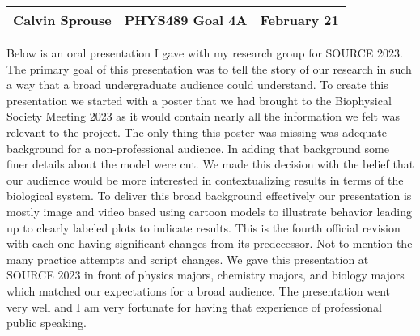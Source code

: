 \documentclass[a4paper, 12pt]{config/homework}
\begin{document}
\noindent
\begin{tabularx}{\textwidth}{>{\centering\arraybackslash}X>{\centering\arraybackslash}X>{\centering\arraybackslash}X}
Calvin Sprouse & PHYS489 Goal 4A & 2024 February 21\\
\midrule
\end{tabularx}


Below is an oral presentation I gave with my research group for SOURCE 2023. The primary goal of this presentation was to tell the story of our research in such a way that a broad undergraduate audience could understand. To create this presentation we started with a poster that we had brought to the Biophysical Society Meeting 2023 as it would contain nearly all the information we felt was relevant to the project. The only thing this poster was missing was adequate background for a non-professional audience. In adding that background some finer details about the model were cut. We made this decision with the belief that our audience would be more interested in contextualizing results in terms of the biological system. To deliver this broad background effectively our presentation is mostly image and video based using cartoon models to illustrate behavior leading up to clearly labeled plots to indicate results. This is the fourth official revision with each one having significant changes from its predecessor. Not to mention the many practice attempts and script changes. We gave this presentation at SOURCE 2023 in front of physics majors, chemistry majors, and biology majors which matched our expectations for a broad audience. The presentation went very well and I am very fortunate for having that experience of professional public speaking.


\end{document}
